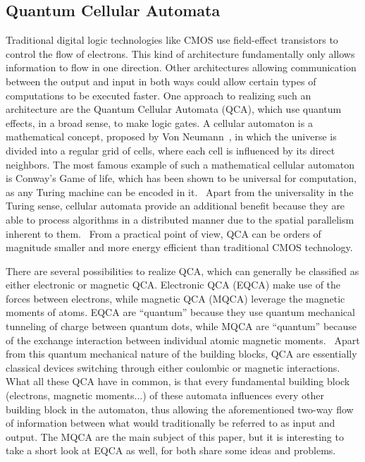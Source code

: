 \documentclass[11pt,a4paper,english]{article}
\begin{document}
\subsection{Quantum Cellular Automata}
Traditional digital logic technologies like CMOS use field-effect transistors to control the flow of electrons. This kind of architecture fundamentally only allows information to flow in one direction. Other architectures allowing communication between the output and input in both ways could allow certain types of computations to be executed faster. One approach to realizing such an architecture are the Quantum Cellular Automata (QCA), which use quantum effects, in a broad sense, to make logic gates. A cellular automaton is a mathematical concept, proposed by Von Neumann~\cite{Sideinfo_SelfRepAutomata}, in which the universe is divided into a regular grid of cells, where each cell is influenced by its direct neighbors. The most famous example of such a mathematical cellular automaton is Conway's Game of life, which has been shown to be universal for computation, as any Turing machine can be encoded in it.~\cite{QCA_GameOfLife} Apart from the universality in the Turing sense, cellular automata provide an additional benefit because they are able to process algorithms in a distributed manner due to the spatial parallelism inherent to them.~\cite{QCA_GameOfLife} From a practical point of view, QCA can be orders of magnitude smaller and more energy efficient than traditional CMOS technology.~\cite{MQCA_RoomTemp} \par
There are several possibilities to realize QCA, which can generally be classified as either electronic or magnetic QCA. Electronic QCA (EQCA) make use of the forces between electrons, while magnetic QCA (MQCA) leverage the magnetic moments of atoms. EQCA are ``quantum'' because they use quantum mechanical tunneling of charge between quantum dots, while MQCA are ``quantum'' because of the exchange interaction between individual atomic magnetic moments.~\cite{MQCA_RoomTemp} Apart from this quantum mechanical nature of the building blocks, QCA are essentially classical devices switching through either coulombic or magnetic interactions.~\cite{QCA_Algorithms} What all these QCA have in common, is that every fundamental building block (electrons, magnetic moments...) of these automata influences every other building block in the automaton, thus allowing the aforementioned two-way flow of information between what would traditionally be referred to as input and output. The MQCA are the main subject of this paper, but it is interesting to take a short look at EQCA as well, for both share some ideas and problems. \par
\end{document}
